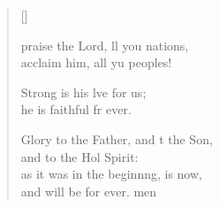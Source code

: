 \settowidth{\versewidth}{Glory to the Father, and to the Son, *}
\begin{verse}[\versewidth]
  \begin{patverse}
     praise the Lord, ll you nations,\Med\\
acclaim him, all yu peoples!

Strong is his lve for us;\Med\\
he is faithful fr ever.

Glory to the Father, and t the Son,\Med\\
and to the Hol Spirit:\\
as it was in the beginn\pointup{\i}ng, is now,\Med\\
and will be for ever. men
  \end{patverse}
\end{verse}
